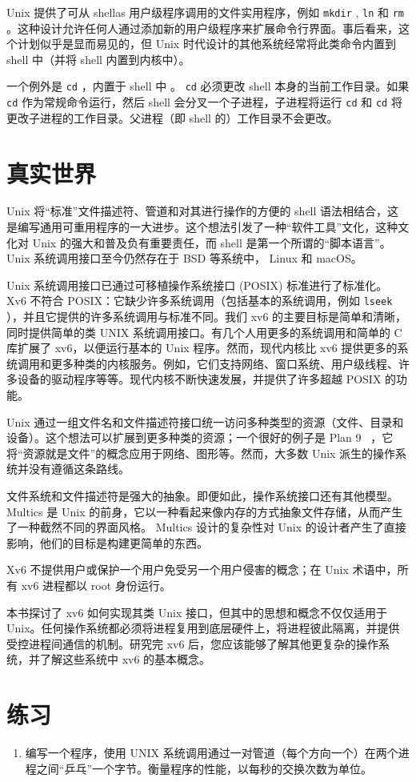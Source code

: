 Unix 提供了可从 shellas 用户级程序调用的文件实用程序，例如
    \lstinline{mkdir}    ,
    \lstinline{ln}    和
    \lstinline{rm}    。这种设计允许任何人通过添加新的用户级程序来扩展命令行界面。事后看来，这个计划似乎是显而易见的，但 Unix 时代设计的其他系统经常将此类命令内置到 shell 中（并将 shell 内置到内核中）。  

一个例外是
    \lstinline{cd}    ，内置于 shell 中
        。
    \lstinline{cd}    必须更改 shell 本身的当前工作目录。如果
    \lstinline{cd}    作为常规命令运行，然后 shell 会分叉一个子进程，子进程将运行
    \lstinline{cd}    和
    \lstinline{cd}    将更改子进程的工作目录。父进程（即 shell 的）工作目录不会更改。
    \section{真实世界  }     

Unix 将“标准”文件描述符、管道和对其进行操作的方便的 shell 语法相结合，这是编写通用可重用程序的一大进步。这个想法引发了一种“软件工具”文化，这种文化对 Unix 的强大和普及负有重要责任，而 shell 是第一个所谓的“脚本语言”。Unix 系统调用接口至今仍然存在于 BSD 等系统中， Linux 和 macOS。  

Unix 系统调用接口已通过可移植操作系统接口 (POSIX) 标准进行了标准化。 Xv6 不符合 POSIX：它缺少许多系统调用（包括基本的系统调用，例如
    \lstinline{lseek}    ），并且它提供的许多系统调用与标准不同。我们 xv6 的主要目标是简单和清晰，同时提供简单的类 UNIX 系统调用接口。有几个人用更多的系统调用和简单的 C 库扩展了 xv6，以便运行基本的 Unix 程序。然而，现代内核比 xv6 提供更多的系统调用和更多种类的内核服务。例如，它们支持网络、窗口系统、用户级线程、许多设备的驱动程序等等。现代内核不断快速发展，并提供了许多超越 POSIX 的功能。  

Unix 通过一组文件名和文件描述符接口统一访问多种类型的资源（文件、目录和设备）。这个想法可以扩展到更多种类的资源；一个很好的例子是 Plan 9~    \cite{Presotto91plan9}    ，它将“资源就是文件”的概念应用于网络、图形等。然而，大多数 Unix 派生的操作系统并没有遵循这条路线。  

文件系统和文件描述符是强大的抽象。即便如此，操作系统接口还有其他模型。 Multics 是 Unix 的前身，它以一种看起来像内存的方式抽象文件存储，从而产生了一种截然不同的界面风格。 Multics 设计的复杂性对 Unix 的设计者产生了直接影响，他们的目标是构建更简单的东西。  

Xv6 不提供用户或保护一个用户免受另一个用户侵害的概念；在 Unix 术语中，所有 xv6 进程都以 root 身份运行。  

本书探讨了 xv6 如何实现其类 Unix 接口，但其中的思想和概念不仅仅适用于 Unix。任何操作系统都必须将进程复用到底层硬件上，将进程彼此隔离，并提供受控进程间通信的机制。研究完 xv6 后，您应该能够了解其他更复杂的操作系统，并了解这些系统中 xv6 的基本概念。
    \section{练习  }     

   \begin{enumerate}


   \item   编写一个程序，使用 UNIX 系统调用通过一对管道（每个方向一个）在两个进程之间“乒乓”一个字节。衡量程序的性能，以每秒的交换次数为单位。  \end{enumerate}     


